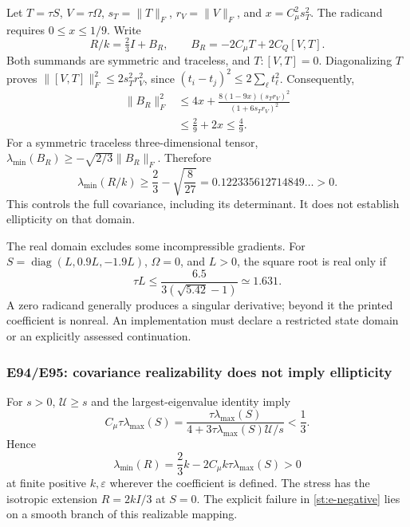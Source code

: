 \documentclass[11pt,a4paper]{article}
\numberwithin{equation}{section}
\newcommand{\eps}{\varepsilon}
\DeclareMathOperator{\diag}{diag}
\begin{document}
Let $T=\tau S$, $V=\tau\Omega$,
$s_T=\|T\|_F$, $r_V=\|V\|_F$, and $x=C_\mu^2s_T^2$.
The radicand requires $0\le x\le1/9$. Write
\[
 R/k=\tfrac23I+B_R,\qquad
 B_R=-2C_\mu T+2C_Q[V,T].
\]
Both summands are symmetric and traceless, and
$T:[V,T]=0$. Diagonalizing $T$ proves
$\|[V,T]\|_F^2\le2s_T^2r_V^2$, since
$(t_i-t_j)^2\le2\sum_\ell t_\ell^2$.
Consequently,
\begin{equation}
 \begin{aligned}
 \|B_R\|_F^2
 &\le4x+\frac{8(1-9x)(s_Tr_V)^2}{(1+6s_Tr_V)^2}\\
 &\le\frac29+2x\le\frac49.
 \end{aligned}
 \label{st:a95-covariance-norm}
\end{equation}
For a symmetric traceless three-dimensional tensor,
$\lambda_{\min}(B_R)\ge-\sqrt{2/3}\|B_R\|_F$. Therefore
\begin{equation}
 \boxed{\lambda_{\min}(R/k)
 \ge\frac23-\sqrt{\frac8{27}}
 =0.122335612714849\ldots>0.}
 \label{st:a95-covariance-bound}
\end{equation}
This controls the full covariance, including its determinant.
It does not establish ellipticity on that domain.

The real domain excludes some incompressible gradients. For
$S=\diag(L,0.9L,-1.9L)$, $\Omega=0$, and $L>0$, the square root
is real only if
\begin{equation}
 \tau L\le\frac{6.5}{3(\sqrt{5.42}-1)}
          \simeq1.631.
 \label{st:a95-real-domain}
\end{equation}
A zero radicand generally produces a singular derivative; beyond it
the printed coefficient is nonreal. An implementation must declare
a restricted state domain or an explicitly assessed continuation.

\subsubsection{E94/E95: covariance realizability does not imply ellipticity}

For $s>0$, $\mathcal U\ge s$ and the largest-eigenvalue identity imply
\[
 C_\mu\tau\lambda_{\max}(S)
 =\frac{\tau\lambda_{\max}(S)}
        {4+3\tau\lambda_{\max}(S)\mathcal U/s}<\frac13.
\]
Hence
\begin{equation}
 \boxed{\lambda_{\min}(R)
 =\frac23k-2C_\mu k\tau\lambda_{\max}(S)>0}
 \label{st:e-covariance}
\end{equation}
at finite positive $k,\eps$ wherever the coefficient is defined.
The stress has the isotropic extension $R=2kI/3$ at $S=0$.
The explicit failure in \cref{st:e-negative} lies on a smooth branch
of this realizable mapping.
\end{document}
